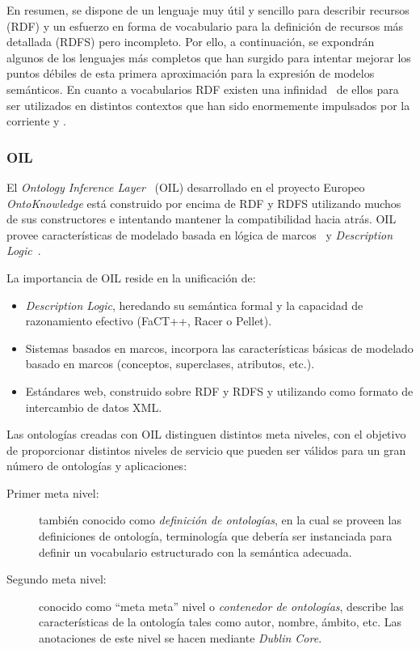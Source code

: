 En resumen, se dispone de un lenguaje muy útil y sencillo para describir recursos (RDF) y 
un esfuerzo en forma de vocabulario para la definición de recursos más detallada (RDFS) pero incompleto. 
Por ello, a continuación, se expondrán algunos de los lenguajes más completos que han surgido para 
intentar mejorar los puntos débiles de esta primera aproximación para la expresión de modelos semánticos. En cuanto
a vocabularios RDF existen una infinidad~\cite{common-vocabularies} de ellos para ser utilizados en distintos contextos que han sido
enormemente impulsados por la corriente \linkeddata y \opendata.

\subsubsection{OIL}
El \textit{Ontology Inference Layer}~\cite{Fensel01oil:an} (\gls{OIL}) desarrollado en el proyecto Europeo 
\textit{OntoKnowledge} está construido por encima de \gls{RDF} y RDFS utilizando muchos de sus constructores e intentando
mantener la compatibilidad hacia atrás. OIL provee características de modelado
basada en lógica de marcos~\cite{Kifer:1989:FHL:66926.66939} y \textit{Description Logic}~\cite{baader03description}.

La importancia de OIL reside en la unificación de:
\begin{itemize}
\item \textit{Description Logic}, heredando su semántica formal y la capacidad
de razonamiento efectivo (FaCT++, Racer o Pellet).
\item Sistemas basados en marcos, incorpora las características básicas de
modelado basado en marcos (conceptos, superclases, atributos, etc.).
\item Estándares web, construido sobre RDF y RDFS y utilizando como formato de
intercambio de datos XML.
\end{itemize}

Las ontologías creadas con OIL distinguen distintos meta niveles, con el
objetivo de proporcionar distintos niveles de servicio que pueden ser válidos para un
gran número de ontologías y aplicaciones:
\begin{description}
\item[Primer meta nivel:] también conocido como \textit{definición de ontologías}, en la
cual se proveen las definiciones de ontología, terminología que debería ser
instanciada para definir un vocabulario estructurado con la semántica adecuada.
\item[Segundo meta nivel:] conocido como ``meta meta'' nivel o \textit{contenedor de
ontologías}, describe las características de la ontología tales como autor,
nombre, ámbito, etc. Las anotaciones de este nivel se hacen mediante
\textit{Dublin Core}.
\end{description}

